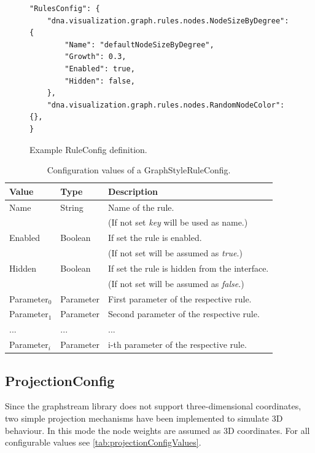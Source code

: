 \begin{figure} [h]
\begin{lstlisting}
"RulesConfig": {
	"dna.visualization.graph.rules.nodes.NodeSizeByDegree": {
		"Name": "defaultNodeSizeByDegree",
		"Growth": 0.3,
		"Enabled": true,
		"Hidden": false,
	},
	"dna.visualization.graph.rules.nodes.RandomNodeColor": {},
}
\end{lstlisting}
\caption{Example RuleConfig definition.}
\label{config:exampleRuleConfig}
\end{figure}

\begin{table}[h]
\centering
\begin{tabular}[h]{|l|l|l|}\hline
	\textbf{Value} & \textbf{Type} & \textbf{Description}\\
	\hline
	Name & String & Name of the rule.\\
	& & (If not set \emph{key} will be used as name.)\\
	\hline
	Enabled & Boolean & If set the rule is enabled.\\
	& & (If not set will be assumed as \emph{true}.)\\
	\hline
	Hidden & Boolean & If set the rule is hidden from the interface.\\
	& & (If not set will be assumed as \emph{false}.)\\
	\hline
	Parameter$_0$ & Parameter & First parameter of the respective rule.\\
	\hline
	Parameter$_1$ & Parameter & Second parameter of the respective rule.\\
	\hline
	... & ... & ...\\
	\hline	
	Parameter$_i$ & Parameter & i-th parameter of the respective rule.\\
	\hline
\end{tabular}
\caption{Configuration values of a GraphStyleRuleConfig.}
\label{tab:graphStyleRuleConfigValues}
\end{table}


\subsection{ProjectionConfig}
\label{ss:projectionConfig}
Since the graphstream library does not support three-dimensional coordinates, two simple projection mechanisms have been implemented to simulate 3D behaviour. In this mode the node weights are assumed as 3D coordinates. For all configurable values see \ref{tab:projectionConfigValues}.

